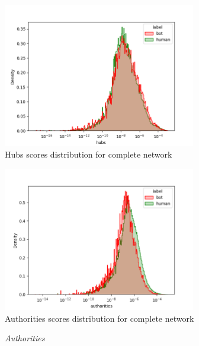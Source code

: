 \documentclass[12pt, a4paper]{article}
\begin{document}
\begin{itemize}
\begin{figure}[H]
                    \centering
                    \includegraphics[width=0.75\textwidth]{results/complete_hubs.png}
                    \caption{Hubs scores distribution for complete network}
                \end{figure}
                \begin{figure}[H]
                    \centering
                    \includegraphics[width=0.75\textwidth]{results/complete_authorities.png}
                    \caption{Authorities scores distribution for complete network}
                \end{figure}
                \begin{figure}[H]
    				\centering
    				\begin{minipage}[b]{0.49\textwidth}    				
        				\centering
        				\setlength{\fboxsep}{0pt}
    					\setlength{\fboxrule}{0.5pt}
        				\small\textit{\small Authorities}
    				\end{minipage}
    				\hfill
    				\begin{minipage}[b]{0.49\textwidth}

\end{minipage}
\end{figure}
\end{itemize}
\end{document}
